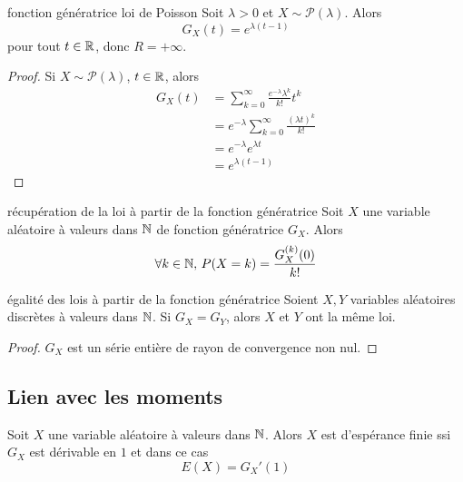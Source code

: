\begin{proposition}{fonction génératrice loi de Poisson}{}
    Soit $\lambda > 0$ et $X \sim \mathcal P(\lambda)$. Alors 
    $$ G_X(t) = e^{\lambda (t - 1)} $$
    pour tout $t \in \mathbb{R}$, donc $R = + \infty$.
\end{proposition}

\begin{proof}
    Si $X \sim \mathcal P(\lambda)$, $t \in \mathbb{R}$, alors
    \begin{align}
        G_X(t) & = \sum_{k = 0}^{\infty} \frac{e^{- \lambda} \lambda^k}{k!} t^k \\
        & = e^{- \lambda} \sum_{k = 0}^{\infty} \frac{(\lambda t)^k}{k!} \\
        & = e^{- \lambda} e^{\lambda t} \\
        & = e^{\lambda (t - 1)}
    \end{align}
\end{proof}

\begin{theoreme}{récupération de la loi à partir de la fonction génératrice}{}
    Soit $X$ une variable aléatoire à valeurs dans $\mathbb{N}$ de fonction génératrice $G_X$.
    Alors $$\forall k \in \mathbb{N}, \, P(X = k) = \frac{G_X^{(k)}(0)}{k!}$$
\end{theoreme}

\begin{corollaire}{égalité des lois à partir de la fonction génératrice}{}
    Soient $X, Y$ variables aléatoires discrètes à valeurs dans $\mathbb{N}$.
    Si $G_X = G_Y$, alors $X$ et $Y$ ont la même loi.
\end{corollaire}

\begin{proof}
    $G_X$ est un série entière de rayon de convergence non nul. 
\end{proof}

\subsection{Lien avec les moments}

\begin{theoreme}{}{}
    Soit $X$ une variable aléatoire à valeurs dans $\mathbb{N}$. Alors $X$ est 
    d'espérance finie ssi $G_X$ est dérivable en $1$ et dans ce cas
    $$ E(X) = G_X'(1) $$
\end{theoreme}

